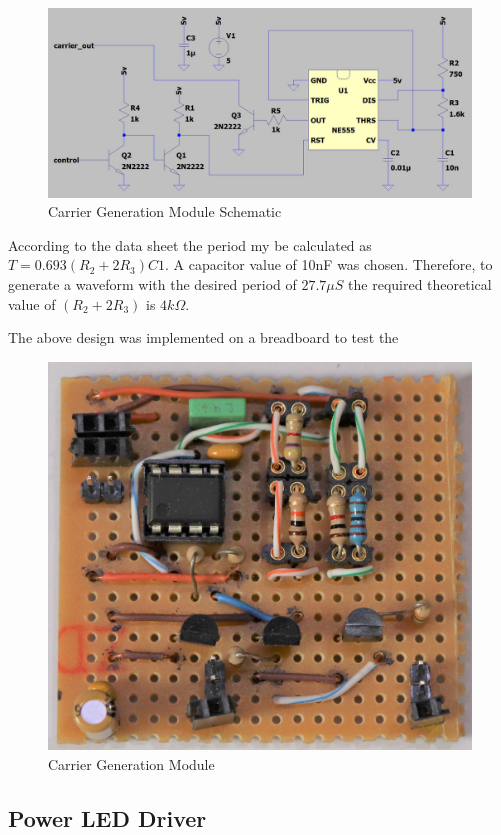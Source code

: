 \begin{figure}[H]
	\centering
	\includegraphics[width=.8\textwidth]{figures/design/carrier_waveform_generator_555.JPG}
	\caption{Carrier Generation Module Schematic}
	\label{fig:schematic_carrier_generation}
\end{figure}

According to the data sheet the period my be calculated as \(T = 0.693 (R_2 + 2R_3) C1\). A capacitor value of 10nF was chosen. Therefore, to generate a waveform with the desired period of $27.7\mu S$ the required theoretical value of $(R_2 + 2R_3)$ is $4k\Omega$.

The above design was implemented on a breadboard to test the


\begin{figure}[H]
	\centering
	\includegraphics[width=.6\textwidth]{figures/modules/carrier_generator.jpg}
	\caption{Carrier Generation Module}
	\label{fig:module_carrier_generation}
\end{figure}

\subsection{Power LED Driver}

